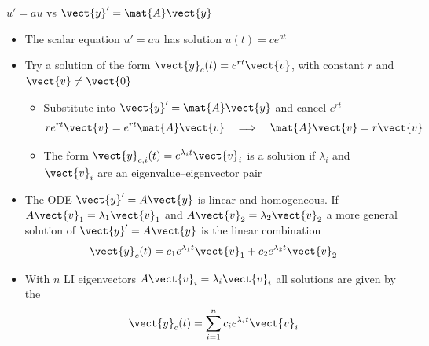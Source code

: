 \begin{frame}{$u'=a u$ \quad vs \quad $\vect{y}'=\mat{A}\vect{y}$}
\begin{itemize}
  \item The scalar equation $u'=au$ has solution $u(t)=ce^{at}$
  \item Try a solution of the form $\vect{y}_c(t)=e^{rt}\vect{v}$, with constant $r$ and $\vect{v}\ne\vect{0}$
  \begin{itemize}
    \item Substitute into $\vect{y}'=\mat{A}\vect{y}$ and cancel $e^{rt}$
    \[
      re^{rt}\vect{v}=e^{rt}\mat{A}\vect{v}
      \quad\Longrightarrow\quad
      \mat{A}\vect{v}=r\vect{v}
    \]
    \item The form $\vect{y}_{c,i}(t)=e^{\lambda_i t}\vect{v}_i$ is a solution if $\lambda_i$ and $\vect{v}_i$ are an eigenvalue--eigenvector pair
  \end{itemize}
  \item The ODE $\vect{y}'= A \vect{y}$ is linear and homogeneous.
  If 
  $A\vect{v}_1 = \lambda_1 \vect{v}_1$ and 
  $A\vect{v}_2 = \lambda_2 \vect{v}_2$ 
  a more general solution of $\vect{y}'= A \vect{y}$ is the linear combination 
  \[
    \vect{y}_c(t)=c_1e^{\lambda_1t}\vect{v}_1+c_2e^{\lambda_2t}\vect{v}_2
  \]
  \item With $n$ LI eigenvectors 
  $A\vect{v}_i = \lambda_i \vect{v}_i$ 
  all solutions are given by the    
  \[
  \vect{y}_c(t)= \sum_{i=1}^n c_i e^{\lambda_i t}\vect{v}_i
  \]
\end{itemize}
\end{frame}
